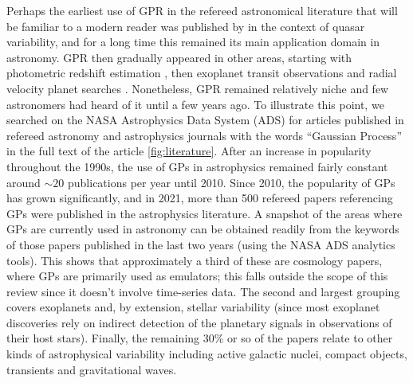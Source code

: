 \documentclass[letterpaper]{ar-1col}
\begin{document}
Perhaps the earliest use of GPR in the refereed astronomical literature that will be familiar to a modern reader was published by \citet{prh92a} in the context of quasar variability, and for a long time this remained its main application domain in astronomy. GPR then gradually appeared in other areas, starting with photometric redshift estimation \citep{2006ApJ...647..102W}, then exoplanet transit observations \citep{2009ApJ...704...51C,2012MNRAS.419.2683G} and radial velocity planet searches \citep{2012MNRAS.419.3147A,2014MNRAS.443.2517H}. Nonetheless, GPR remained relatively niche and few astronomers had heard of it until a few years ago. To illustrate this point, we searched on the NASA Astrophysics Data System (ADS) for articles published in refereed astronomy and astrophysics journals with the words ``Gaussian Process'' in the full text of the article \autoref{fig:literature}.
After an increase in popularity throughout the 1990s, the use of GPs in astrophysics remained fairly constant around $\sim20$ publications per year until 2010.
Since 2010, the popularity of GPs has grown significantly, and in 2021, more than 500 refereed papers referencing GPs were published in the astrophysics literature. A snapshot of the areas where GPs are currently used in astronomy can be obtained readily from the keywords of those papers published in the last two years (using the NASA ADS analytics tools). This shows that approximately a third of these are cosmology papers, where GPs are primarily used as emulators; this falls outside the scope of this review since it doesn't involve time-series data. The second and largest grouping covers exoplanets and, by extension, stellar variability (since most exoplanet discoveries rely on indirect detection of the planetary signals in observations of their host stars). Finally, the remaining 30\% or so of the papers relate to other kinds of astrophysical variability including active galactic nuclei, compact objects, transients and gravitational waves.
\end{document}
